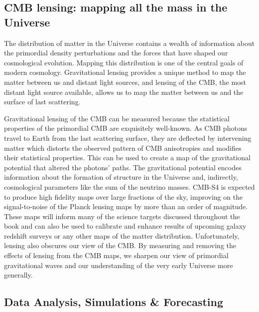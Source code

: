\subsection*{CMB lensing: mapping all the mass in the Universe}


The distribution of matter in the Universe contains a wealth of information about the primordial density perturbations and the forces that have shaped our cosmological evolution. Mapping this distribution is one of the central goals of modern cosmology. Gravitational lensing provides a unique method to map the matter between us and distant light sources, and lensing of the CMB, the most distant light source available, allows us to map the matter between us and the surface of last scattering.

Gravitational lensing of the CMB can be measured because the statistical properties of the primordial CMB are exquisitely well-known. As CMB photons travel to Earth from the last scattering surface, they are deflected by intervening matter which distorts the observed pattern of CMB anisotropies and modifies their statistical properties. This can be used to create a map of the gravitational potential that altered the photons' paths. The gravitational potential encodes information about the formation of structure in the Universe and, indirectly, cosmological parameters like the sum of the neutrino masses.  CMB-S4 is expected to produce high fidelity maps over large fractions of the sky, improving on the signal-to-noise of  the Planck lensing maps by more than an order of magnitude.  These maps will inform many of the science targets discussed throughout the book and can also be used to calibrate and enhance results of upcoming galaxy redshift surveys or any other maps of the matter distribution.  Unfortunately, lensing also obscures our view of the CMB.  By measuring and removing the effects of lensing from the CMB maps, we sharpen our view of primordial gravitational waves and our understanding of the very early Universe more generally.  

\subsection*{Data Analysis, Simulations \& Forecasting}

